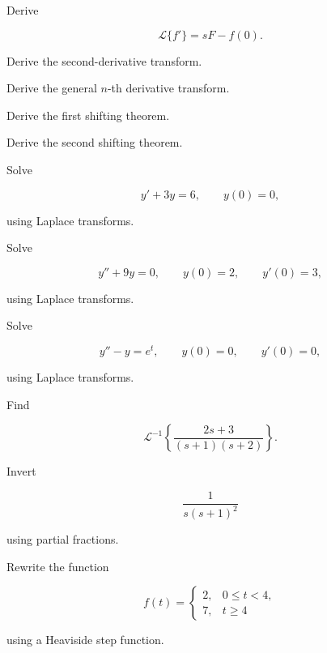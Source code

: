 \begin{exercise}[3]
Derive

\[
\mathcal{L}\{f'\}
=
sF-f(0).
\]
\end{exercise}

\begin{exercise}[3]
Derive the second-derivative transform.
\end{exercise}

\begin{exercise}[3]
Derive the general \(n\)-th derivative transform.
\end{exercise}

\begin{exercise}[3]
Derive the first shifting theorem.
\end{exercise}

\begin{exercise}[3]
Derive the second shifting theorem.
\end{exercise}

\begin{exercise}[3]
Solve

\[
y'+3y=6,
\qquad
y(0)=0,
\]

using Laplace transforms.
\end{exercise}

\begin{exercise}[3]
Solve

\[
y''+9y=0,
\qquad
y(0)=2,
\qquad
y'(0)=3,
\]

using Laplace transforms.
\end{exercise}

\begin{exercise}[3]
Solve

\[
y''-y=e^t,
\qquad
y(0)=0,
\qquad
y'(0)=0,
\]

using Laplace transforms.
\end{exercise}

\begin{exercise}[3]
Find

\[
\mathcal{L}^{-1}
\left\{
\frac{
2s+3
}{
(s+1)(s+2)
}
\right\}.
\]
\end{exercise}

\begin{exercise}[3]
Invert

\[
\frac1{
s(s+1)^2
}
\]

using partial fractions.
\end{exercise}

\begin{exercise}[3]
Rewrite the function

\[
f(t)
=
\begin{cases}
2,
&
0\leq t<4,
\\
7,
&
t\geq4
\end{cases}
\]

using a Heaviside step function.
\end{exercise}

